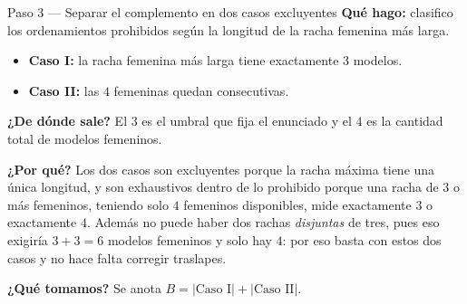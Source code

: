 \documentclass[11pt]{article}
\begin{document}
\begin{paso}{Paso 3 --- Separar el complemento en dos casos excluyentes}
\textbf{Qué hago:} clasifico los ordenamientos prohibidos según la longitud de la racha femenina más larga.
\begin{itemize}[leftmargin=*]
  \item \textbf{Caso I:} la racha femenina más larga tiene exactamente $3$ modelos.
  \item \textbf{Caso II:} las $4$ femeninas quedan consecutivas.
\end{itemize}

\textbf{¿De dónde sale?} El $3$ es el umbral que fija el enunciado y el $4$ es la cantidad total de modelos femeninos.

\textbf{¿Por qué?} Los dos casos son excluyentes porque la racha máxima tiene una única longitud, y son exhaustivos dentro de lo prohibido porque una racha de $3$ o más femeninos, teniendo solo $4$ femeninos disponibles, mide exactamente $3$ o exactamente $4$. Además no puede haber dos rachas \emph{disjuntas} de tres, pues eso exigiría $3+3=6$ modelos femeninos y solo hay $4$: por eso basta con estos dos casos y no hace falta corregir traslapes.

\textbf{¿Qué tomamos?} Se anota $B = |\text{Caso I}| + |\text{Caso II}|$.
\end{paso}
\end{document}

